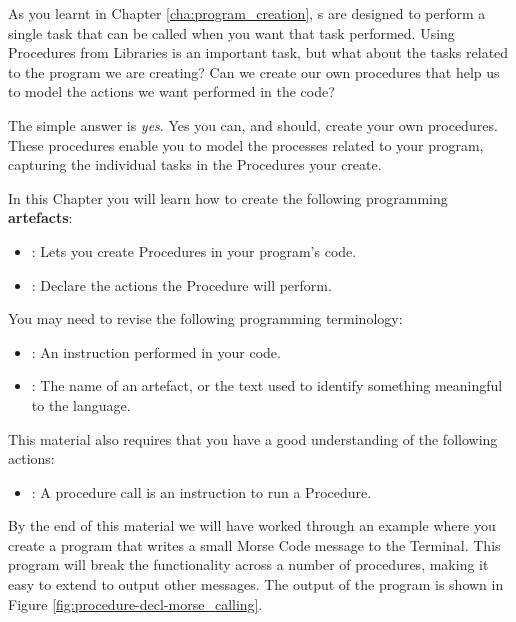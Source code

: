 As you learnt in Chapter \ref{cha:program_creation}, s are designed to perform a single task that can be called when you want that task performed. Using Procedures from Libraries is an important task, but what about the tasks related to the program we are creating? Can we create our own procedures that help us to model the actions we want performed in the code?

The simple answer is \emph{yes}. Yes you can, and should, create your own procedures. These procedures enable you to model the processes related to your program, capturing the individual tasks in the Procedures your create. 

In this Chapter you will learn how to create the following programming \textbf{artefacts}:

\begin{itemize}
  \item {}: Lets you create Procedures in your program's code.
  \item {}: Declare the actions the Procedure will perform.
\end{itemize}

\bigskip

You may need to revise the following programming terminology:
\begin{itemize}
  \item {}: An instruction performed in your code.
  \item {}: The name of an artefact, or the text used to identify something meaningful to the language.
\end{itemize}

This material also requires that you have a good understanding of the following actions:
\begin{itemize}
  \item {}: A procedure call is an instruction to run a Procedure.
\end{itemize}

By the end of this material we will have worked through an example where you create a program that writes a small Morse Code message to the Terminal. This program will break the functionality across a number of procedures, making it easy to extend to output other messages. The output of the program is shown in Figure \ref{fig:procedure-decl-morse_calling}.

